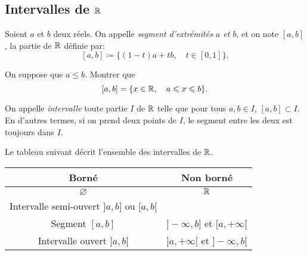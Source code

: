 \documentclass[../main.tex]{subfiles}
\begin{document}
\subsection{Intervalles de $\mathbb R$}

\begin{mydef}[Segment]
    Soient $a$ et $b$ deux réels. On appelle \textit{segment d'extrémités $a$ et $b$}, et on note $[a,b]$, la partie de $\mathbb R$ définie par:
    \[
    [a,b] \coloneqq \{(1-t)a+tb,\quad t\in[0,1] \}.
    \]
\end{mydef}

\begin{exo}[F]
    On suppose que $a\leq b$. Montrer que
    \[
    [a,b] = \{x\in\mathbb R,\quad a\leqslant x\leqslant b \}.
    \]
\end{exo}

\begin{mydef}[Intervalle]
    On appelle \textit{intervalle} toute partie $I$ de $\mathbb R$ telle que pour tous $a,b\in I$, $[a,b]\subset I$. En d'autres termes, si on prend deux points de $I$, le segment entre les deux est toujours dans $I$.
\end{mydef}

\begin{prop}
    Le tableau suivant décrit l'ensemble des intervalles de $\mathbb R$.
    \begin{center}
    \begin{tabular}{|c|c|} \hline
        Borné & Non borné \\ \hline
        $\varnothing$ & $\mathbb R$ \\ \hline
        Intervalle semi-ouvert $]a,b]$ ou $[a,b[$ & \\ \hline
        Segment $[a,b]$ & $]-\infty,b]$ et $[a,+\infty[$ \\ \hline
        Intervalle ouvert $]a,b[$ & $]a,+\infty[$ et $]-\infty,b[$ \\ \hline
    \end{tabular}
    \end{center}
\end{prop}
\end{document}
